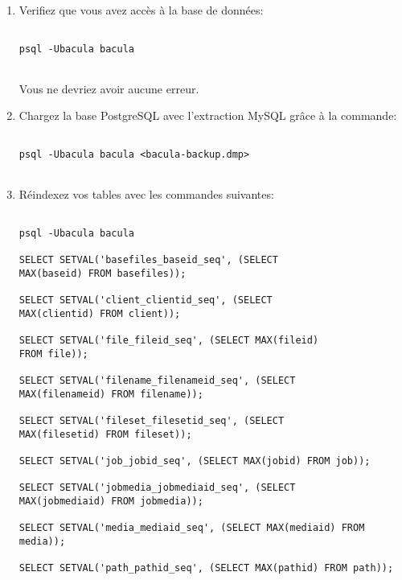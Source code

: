 {{{{\begin{enumerate}
\begin{verbatim}
./make_postgresql_tables
                                
./grant_postgresql_privileges
       
\end{verbatim}
\normalsize

\item Verifiez que vous avez acc\`es \`a la base de donn\'ees:  

   \footnotesize
\begin{verbatim}
  
psql -Ubacula bacula
      
\end{verbatim}
\normalsize

Vous ne devriez avoir aucune erreur.  
\item Chargez la base PostgreSQL avec l'extraction MySQL gr\^ace \`a la
   commande:  

\footnotesize
\begin{verbatim}

psql -Ubacula bacula <bacula-backup.dmp>
      
\end{verbatim}
\normalsize

\item R\'eindexez vos tables avec les commandes suivantes:  

   \footnotesize
\begin{verbatim}

psql -Ubacula bacula
                
SELECT SETVAL('basefiles_baseid_seq', (SELECT
MAX(baseid) FROM basefiles));

SELECT SETVAL('client_clientid_seq', (SELECT
MAX(clientid) FROM client));

SELECT SETVAL('file_fileid_seq', (SELECT MAX(fileid)
FROM file));

SELECT SETVAL('filename_filenameid_seq', (SELECT
MAX(filenameid) FROM filename));
                
SELECT SETVAL('fileset_filesetid_seq', (SELECT
MAX(filesetid) FROM fileset));
                
SELECT SETVAL('job_jobid_seq', (SELECT MAX(jobid) FROM job));

SELECT SETVAL('jobmedia_jobmediaid_seq', (SELECT
MAX(jobmediaid) FROM jobmedia));

SELECT SETVAL('media_mediaid_seq', (SELECT MAX(mediaid) FROM media));

SELECT SETVAL('path_pathid_seq', (SELECT MAX(pathid) FROM path));
                

\end{verbatim}
\end{enumerate}}}}}
